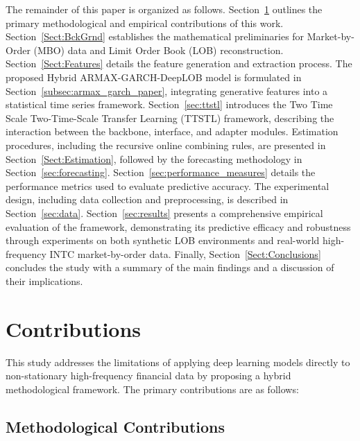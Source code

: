 \documentclass[10pt,a4paper,oneside]{article}
\providecommand{\DIFaddtex}[1]{{\protect\color{blue} \sf #1}} %
\providecommand{\DIFdeltex}[1]{{\protect\color{red} \scriptsize #1}} %
\providecommand{\DIFaddbegin}{} %
\providecommand{\DIFaddend}{} %
\providecommand{\DIFdelbegin}{} %
\providecommand{\DIFdelend}{} %
\providecommand{\DIFadd}[1]{\texorpdfstring{\DIFaddtex{#1}}{#1}} %
\providecommand{\DIFdel}[1]{\texorpdfstring{\DIFdeltex{#1}}{}} %
\newcommand{\DIFscaledelfig}{0.5}
\newlength{\DIFdelgraphicswidth} %
\newlength{\DIFdelgraphicsheight} %
\newcommand{\DIFaddincludegraphics}[2][]{{\color{blue}\fbox{\DIFOincludegraphics[#1]{#2}}}} %
\newcommand{\DIFdelincludegraphics}[2][]{%
\sbox{\DIFdelgraphicsbox}{\DIFOincludegraphics[#1]{#2}}%
\settoboxwidth{\DIFdelgraphicswidth}{\DIFdelgraphicsbox} %
\settoboxtotalheight{\DIFdelgraphicsheight}{\DIFdelgraphicsbox} %
\scalebox{\DIFscaledelfig}{%
\parbox[b]{\DIFdelgraphicswidth}{\usebox{\DIFdelgraphicsbox}\\[-\baselineskip] \rule{\DIFdelgraphicswidth}{0em}}\llap{\resizebox{\DIFdelgraphicswidth}{\DIFdelgraphicsheight}{%
\setlength{\unitlength}{\DIFdelgraphicswidth}%
\begin{picture}(1,1)%
\thicklines\linethickness{2pt} %
{\color[rgb]{1,0,0}\put(0,0){\framebox(1,1){}}}%
{\color[rgb]{1,0,0}\put(0,0){\line( 1,1){1}}}%
{\color[rgb]{1,0,0}\put(0,1){\line(1,-1){1}}}%
\end{picture}%
}\hspace*{3pt}}} %
} %
\DeclareRobustCommand{\DIFaddbegin}{\DIFOaddbegin \let\includegraphics\DIFaddincludegraphics} %
\DeclareRobustCommand{\DIFaddend}{\DIFOaddend \let\includegraphics\DIFOincludegraphics} %
\DeclareRobustCommand{\DIFdelbegin}{\DIFOdelbegin \let\includegraphics\DIFdelincludegraphics} %
\DeclareRobustCommand{\DIFdelend}{\DIFOaddend \let\includegraphics\DIFOincludegraphics} %
\begin{document}
The remainder of this paper is organized as follows. Section~\ref{Sect:Contributions} outlines the primary methodological and empirical contributions of this work. Section~\ref{Sect:BckGrnd} establishes the mathematical preliminaries for Market-by-Order (MBO) data and Limit Order Book (LOB) reconstruction. Section~\ref{Sect:Features} details the feature generation and extraction process. The proposed Hybrid ARMAX-GARCH-DeepLOB model is formulated in Section~\ref{subsec:armax_garch_paper}, integrating generative features into a statistical time series framework. Section~\ref{sec:ttstl} introduces the \DIFdelbegin \DIFdel{Two Time Scale }\DIFdelend \DIFaddbegin \DIFadd{Two-Time-Scale }\DIFaddend Transfer Learning (TTSTL) framework, describing the interaction between the backbone, interface, and adapter modules. Estimation procedures, including the recursive online combining rules, are presented in Section~\ref{Sect:Estimation}, followed by the forecasting methodology in Section~\ref{sec:forecasting}.
\DIFaddbegin \DIFadd{Section~\ref{sec:performance_measures} details the performance metrics used to evaluate predictive accuracy.
}\DIFaddend The experimental design, including data collection and preprocessing, is described in Section~\ref{sec:data}.
Section~\ref{sec:results} presents a comprehensive empirical evaluation of the framework, demonstrating its predictive efficacy and robustness through experiments on both synthetic LOB environments and real-world high-frequency INTC market-by-order data. Finally, Section~\ref{Sect:Conclusions} concludes the study with a summary of the main findings and a discussion of their implications.

\section{Contributions}
\label{Sect:Contributions}

This study addresses the limitations of applying deep learning models directly to non-stationary high-frequency financial data by proposing a hybrid methodological framework. The primary contributions are as follows:

\subsection{Methodological Contributions}
\end{document}
